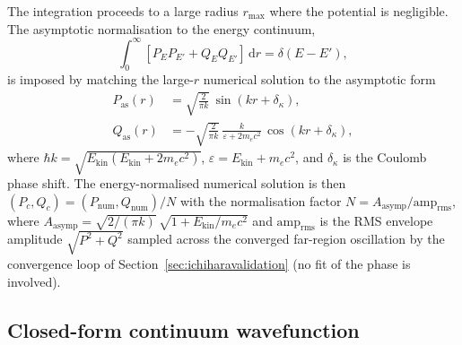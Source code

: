 \documentclass[11pt,a4paper]{article}
\newcommand{\dif}{\mathrm{d}}
\begin{document}
The integration proceeds to a large radius $r_{\mathrm{max}}$ where the
potential is negligible.  The asymptotic normalisation to the energy
continuum,
\begin{equation}
  \int_{0}^{\infty} [P_{E}P_{E'} + Q_{E}Q_{E'}]\,\dif r = \delta(E-E'),
\end{equation}
is imposed by matching the large-$r$ numerical solution to the
asymptotic form
\begin{align}
  P_{\mathrm{as}}(r) &= \sqrt{\frac{2}{\pi k}}\,
    \sin(kr + \delta_{\kappa}),\\
  Q_{\mathrm{as}}(r) &= -\sqrt{\frac{2}{\pi k}}\,
    \frac{k}{\varepsilon + 2m_{e}c^{2}}\,
    \cos(kr + \delta_{\kappa}),
\end{align}
where $\hbar k = \sqrt{E_{\mathrm{kin}}(E_{\mathrm{kin}}+2m_{e}c^{2})}$,
$\varepsilon = E_{\mathrm{kin}} + m_{e}c^{2}$, and $\delta_{\kappa}$
is the Coulomb phase shift.  The energy-normalised numerical solution
is then $(P_{c},Q_{c}) = (P_{\mathrm{num}},Q_{\mathrm{num}})/N$ with
the normalisation factor
$N = A_{\mathrm{asymp}}/\mathrm{amp}_{\mathrm{rms}}$, where
$A_{\mathrm{asymp}}=\sqrt{2/(\pi k)}\,\sqrt{1+E_{\mathrm{kin}}/m_{e}c^{2}}$
and $\mathrm{amp}_{\mathrm{rms}}$ is the RMS envelope amplitude
$\sqrt{P^{2}+Q^{2}}$ sampled across the converged far-region
oscillation by the convergence loop of
Section~\ref{sec:ichiharavalidation} (no fit of the phase is involved).

\subsection{Closed-form continuum wavefunction}
\label{sec:closedform}
\end{document}

